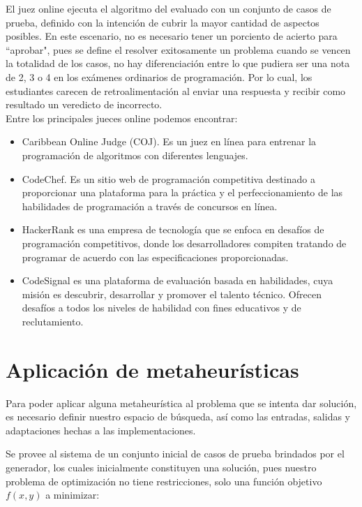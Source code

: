 \documentclass[a4paper,openright,11pt,oneside]{book}
\begin{document}
	El juez online ejecuta el algoritmo del evaluado con un conjunto de casos de prueba, definido con la intención de cubrir la mayor cantidad de aspectos posibles. En este escenario, no es necesario tener un porciento de acierto para ``aprobar", pues se define el resolver exitosamente un problema cuando se vencen la totalidad de los casos, no hay diferenciación entre lo que pudiera ser una nota de 2, 3 o 4 en los exámenes ordinarios de programación. Por lo cual, los estudiantes carecen de retroalimentación al enviar una respuesta y recibir como resultado un veredicto de incorrecto.  \\
	
	Entre los principales jueces online podemos encontrar: 
	\begin{itemize}
		
		\item Caribbean Online Judge (COJ). Es un juez en línea para entrenar la programación de algoritmos con diferentes lenguajes.
		
		\item CodeChef. Es un sitio web de programación competitiva destinado a proporcionar una plataforma para la práctica y el perfeccionamiento de las habilidades de programación a través de concursos en línea.
		
		\item HackerRank es una empresa de tecnología que se enfoca en desafíos de programación competitivos, donde los desarrolladores compiten tratando de programar de acuerdo con las especificaciones proporcionadas.
		
		\item CodeSignal es una plataforma de evaluación basada en habilidades, cuya misión es descubrir, desarrollar y promover el talento técnico. Ofrecen desafíos a todos los niveles de habilidad con fines educativos y de reclutamiento.
		
	\end{itemize}
		
		
\section{Aplicación de metaheurísticas}

	Para poder aplicar alguna metaheurística al problema que se intenta dar solución, es necesario definir nuestro espacio de búsqueda, así como las entradas, salidas y adaptaciones hechas a las implementaciones.
	
	Se provee al sistema de un conjunto inicial de casos de prueba brindados por el generador, los cuales inicialmente constituyen una solución, pues nuestro problema de optimización no tiene restricciones, solo una función objetivo $f(x,y)$ a minimizar: \\
	
\end{document}

